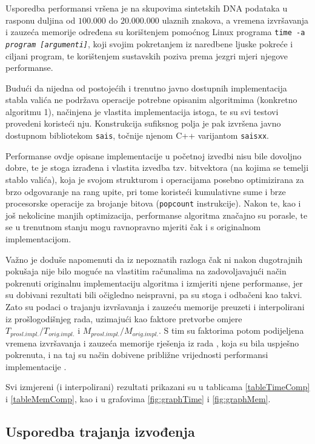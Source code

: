 \documentclass[a4paper,12pt]{article}
\begin{document}
Usporedba performansi vršena je na skupovima sintetskih DNA podataka u rasponu duljina od $100.000$ do $20.000.000$ ulaznih znakova, a vremena izvršavanja i zauzeća memorije određena su korištenjem pomoćnog Linux programa \texttt{time -a \textit{program [argumenti]}}, koji svojim pokretanjem iz naredbene ljuske pokreće i ciljani program, te korištenjem sustavskih poziva prema jezgri mjeri njegove performanse.

Budući da nijedna od postojećih i trenutno javno dostupnih implementacija stabla valića ne podržava operacije potrebne opisanim algoritmima (konkretno algoritmu 1), načinjena je vlastita implementacija istoga, te su svi testovi provedeni koristeći nju. Konstrukcija sufiksnog polja je pak izvršena javno dostupnom bibliotekom \texttt{sais}, točnije njenom C++ varijantom \texttt{saisxx}.

Performanse ovdje opisane implementacije u početnoj izvedbi nisu bile dovoljno dobre, te je stoga izrađena i vlastita izvedba tzv. bitvektora (na kojima se temelji stablo valića), koja je svojom strukturom i operacijama posebno optimizirana za brzo odgovaranje na rang upite, pri tome koristeći kumulativne sume i brze procesorske operacije za brojanje bitova (\texttt{popcount} instrukcije). Nakon te, kao i još nekolicine manjih optimizacija, performanse algoritma značajno su porasle, te se u trenutnom stanju mogu ravnopravno mjeriti čak i s originalnom implementacijom.

Važno je doduše napomenuti da iz nepoznatih razloga čak ni nakon dugotrajnih pokušaja nije bilo moguće na vlastitim računalima na zadovoljavajući način pokrenuti originalnu implementaciju algoritma i izmjeriti njene performanse, jer su dobivani rezultati bili očigledno neispravni, pa su stoga i odbačeni kao takvi. Zato su podaci o trajanju izvršavanja i zauzeću memorije preuzeti i interpolirani iz prošlogodišnjeg rada, uzimajući kao faktore pretvorbe omjere $T_{prosl.impl.}/T_{orig.impl.}$ i $M_{prosl.impl.}/M_{orig.impl.}$. S tim su faktorima potom podijeljena vremena izvršavanja i zauzeća memorije rješenja iz rada \cite{studenti2017}, koja su bila uspješno pokrenuta, i na taj su način dobivene približne vrijednosti performansi implementacije \cite{beller2013}.

Svi izmjereni (i interpolirani) rezultati prikazani su u tablicama \ref{tableTimeComp} i \ref{tableMemComp}, kao i u grafovima \ref{fig:graphTime} i \ref{fig:graphMem}.

\subsection{Usporedba trajanja izvođenja}
\end{document}
